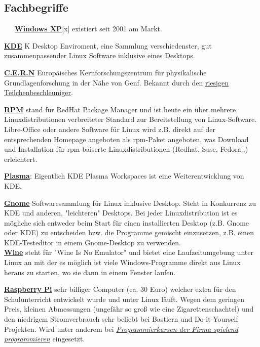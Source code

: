 \subsection*{Fachbegriffe}
~~~\href{http://de.wikipedia.org/wiki/Windows_XP}{\textbf{Windows XP}}[x] existiert seit 2001 am Markt. 

\href{http://de.wikipedia.org/wiki/Kde}{\textbf{KDE}} K Desktop Enviroment, eine Sammlung verschiedenster, gut zusammenpassender Linux Software inklusive eines Desktops. 

\href{http://de.wikipedia.org/wiki/Cern}{\textbf{C.E.R.N}} Europäisches Kernforschungszentrum für physikalische Grundlagenforschung in der Nähe von Genf. Bekannt durch den \href{http://de.wikipedia.org/wiki/Large_Hadron_Collider}{riesigen Teilchenbeschleuniger}. 

\href{http://de.wikipedia.org/wiki/RPM_Package_Manager}{\textbf{RPM}} stand für RedHat Package Manager und ist heute ein über mehrere Linuxdistributionen verbreiteter Standard zur Bereitstellung von Linux-Software. Libre-Office oder andere Software für Linux wird z.B. direkt auf der entsprechenden Homepage angeboten als rpm-Paket angeboten, was Download und Installation für rpm-baiserte Linuxdistributionen (Redhat, Suse, Fedora..) erleichtert. 

\href{http://de.wikipedia.org/wiki/KDE_Plasma_Workspaces}{\textbf{Plasma}}: Eigentlich KDE Plasma Workspaces ist eine Weiterentwicklung von KDE. 

\href{http://de.wikipedia.org/wiki/Gnome}{\textbf{Gnome}} Softwaresammlung für Linux inklusive Desktop. Steht in Konkurrenz zu KDE und anderen, "leichteren" Desktops. Bei jeder Linuxdistribution ist es mögliche sich entweder beim Start für einen installierten Desktop (z.B. Gnome oder KDE) zu entscheiden bzw. die Programme gemischt einzusetzen, z.B. einen KDE-Testeditor in einem Gnome-Desktop zu verwenden. \\
\href{http://de.wikipedia.org/wiki/Wine}{\textbf{Wine}} steht für "Wine Is No Emulator" und bietet eine Laufzeitumgebung unter Linux an mit der es möglich ist viele Windows-Programme direkt aus Linux heraus zu starten, wo sie dann in einem Fenster laufen. 

\href{http://de.wikipedia.org/wiki/Raspberry_Pi}{\textbf{Raspberry Pi}} sehr billiger Computer (ca. 30 Euro) welcher extra für den Schulunterricht entwickelt wurde und unter Linux läuft. Wegen dem geringen Preis, kleinen Abmessungen (ungefähr so groß wie eine Zigarettenschachtel) und den niedrigem Stromverbrauch sehr beliebt bei Bastlern und Do-it-Yourself Projekten. Wird unter anderem bei \href{http://spielend-programmieren.at}{\textit{Programmierkursen der Firma spielend programmieren}} eingesetzt. 

